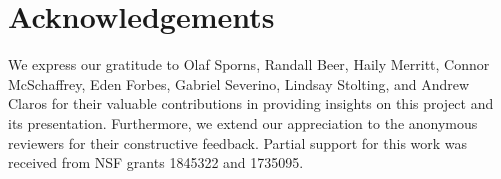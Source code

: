 \section{Acknowledgements}

We express our gratitude to Olaf Sporns, Randall Beer, Haily Merritt, Connor McSchaffrey, Eden Forbes, Gabriel Severino, Lindsay Stolting, and Andrew Claros for their valuable contributions in providing insights on this project and its presentation. Furthermore, we extend our appreciation to the anonymous reviewers for their constructive feedback. Partial support for this work was received from NSF grants 1845322 and 1735095.